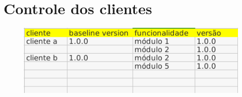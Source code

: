 \documentclass{article}
\begin{document}
    \section{Controle dos clientes}
        \begin{figure}[H]
			\centering
			\includegraphics[width=0.7\linewidth]{controle_cliente_software.png}
			\caption{}
			\label{fig:controleclientesoftware}
		\end{figure}
        
    \newpage
	\begin{appendix}
		\listoffigures
		\listoftables
	\end{appendix}
\end{document}
